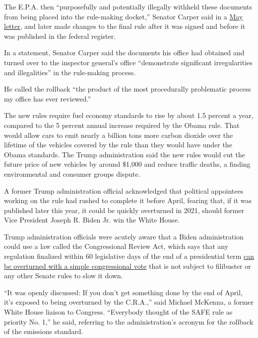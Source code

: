 The E.P.A. then ``purposefully and potentially illegally withheld these
documents from being placed into the rule-making docket,'' Senator
Carper said in a
\href{https://www.epw.senate.gov/public/_cache/files/d/0/d097fdd0-0105-4a39-9604-f8a1ddd5aaa6/735111CEA8E5499130FD7DD880453FCF.05-18-20-tc-cars-letter-to-epa-ig-002-.pdf}{May
letter}, and later made changes to the final rule after it was signed
and before it was published in the federal register.

In a statement, Senator Carper said the documents his office had
obtained and turned over to the inspector general's office ``demonstrate
significant irregularities and illegalities'' in the rule-making
process.

He called the rollback ``the product of the most procedurally
problematic process my office has ever reviewed.''

The new rules require fuel economy standards to rise by about 1.5
percent a year, compared to the 5 percent annual increase required by
the Obama rule. That would allow cars to emit nearly a billion tons more
carbon dioxide over the lifetime of the vehicles covered by the rule
than they would have under the Obama standards. The Trump administration
said the new rules would cut the future price of new vehicles by around
\$1,000 and reduce traffic deaths, a finding environmental and consumer
groups dispute.

A former Trump administration official acknowledged that political
appointees working on the rule had rushed to complete it before April,
fearing that, if it was published later this year, it could be quickly
overturned in 2021, should former Vice President Joseph R. Biden Jr. win
the White House.

Trump administration officials were acutely aware that a Biden
administration could use a law called the Congressional Review Act,
which says that any regulation finalized within 60 legislative days of
the end of a presidential term
\href{https://www.nytimes3xbfgragh.onion/2020/07/17/climate/trump-regulations-election.html}{can
be overturned with a simple congressional vote} that is not subject to
filibuster or any other Senate rules to slow it down.

``It was openly discussed: If you don't get something done by the end of
April, it's exposed to being overturned by the C.R.A.,'' said Michael
McKenna, a former White House liaison to Congress. ``Everybody thought
of the SAFE rule as priority No. 1,'' he said, referring to the
administration's acronym for the rollback of the emissions standard.

